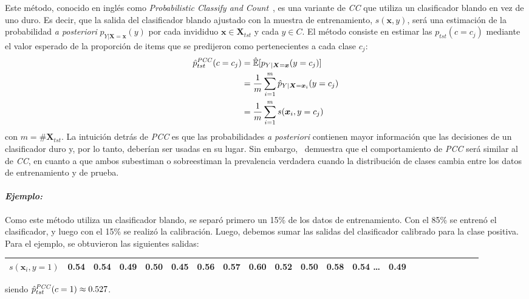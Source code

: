 Este método, conocido en inglés como {\it Probabilistic Classify and
Count\/}~\cite{bella2010quantification, tang2010network}, es una variante de
{\it CC\/} que utiliza un clasificador blando en vez de uno duro. Es decir, que
la salida del clasificador blando ajustado con la muestra de entrenamiento,
\(s(\boldsymbol{x}, y)\), será una estimación de la probabilidad {\it a
posteriori\/} \({p}_{Y|\boldsymbol{X}=\boldsymbol{x}}(y)\) por cada invididuo
\(\boldsymbol{x} \in \boldsymbol{X}_{tst}\) y cada \(y \in C\). El método
consiste en estimar las \({p}_{tst}(c=c_j)\) mediante el valor esperado de la
proporción de items que se predijeron como pertenecientes a cada clase \(c_j\):
\begin{align}
\begin{split}
    \hat p^{\it PCC\/}_{tst}(c=c_j) &= \mathbb{\hat E}[p_{Y|\boldsymbol{X}=\boldsymbol{x}}(y=c_j)] \\
    &= \frac{1}{m} \sum \limits_{i=1}^{m}{\hat p_{Y|\boldsymbol{X}=\boldsymbol{x}_i}(y=c_j)} \\
    &= \frac{1}{m} \sum \limits_{i=1}^{m}{s(\boldsymbol{x}_i, y=c_j)}
\end{split}
\end{align}
con \(m=\#\boldsymbol{X}_{tst}\). La intuición detrás de {\it PCC\/} es que las
probabilidades {\it a posteriori\/} contienen mayor información que las
decisiones de un clasificador duro y, por lo tanto, deberían ser usadas en su
lugar. Sin embargo,~\citet[Corolario 6, p.157 y p.163]{tasche2014exact}
demuestra que el comportamiento de {\it PCC\/} será similar al de {\it CC}, en
cuanto a que ambos subestiman o sobreestiman la prevalencia verdadera cuando la
distribución de clases cambia entre los datos de entrenamiento y de prueba.

\paragraph{\it Ejemplo:\/} Como este método utiliza un clasificador blando, se
separó primero un 15\% de los datos de entrenamiento. Con el 85\% se entrenó el
clasificador, y luego con el 15\% se realizó la calibración. Luego, debemos
sumar las salidas del clasificador calibrado para la clase positiva. Para el
ejemplo, se obtuvieron las siguientes salidas:
\begin{center}
    \begin{tabular}{lrrrrrrrrrrrrrrrrrrrrr}
        \toprule
        \textbf{$s(\boldsymbol{x}_i, y=1)$} & 0.54 & 0.54 & 0.49 & 0.50 & 0.45 &
        0.56 & 0.57 & 0.60 & 0.52 & 0.50 & 0.58 & 0.54 \ldots & 0.49 \\
        \bottomrule
    \end{tabular}
\end{center}
siendo \(\hat p^{\it PCC\/}_{tst}(c=1) \approx 0.527\).

